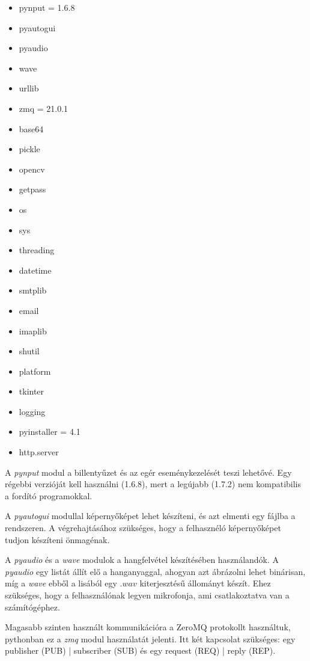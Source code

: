 \documentclass[12pt,a4paper,oneside]{report}
\begin{document}
\begin{multicols}{2}
\begin{itemize}
\item pynput = 1.6.8
\item pyautogui
\item pyaudio
\item wave
\item urllib
\item zmq = 21.0.1
\item base64
\item pickle
\item opencv
\item getpass
\item os
\item sys
\item threading
\item datetime
\item smtplib
\item email
\item imaplib
\item shutil
\item platform
\item tkinter
\item logging
\item pyinstaller = 4.1
\item http.server
\end{itemize}
\end{multicols}
A \emph{pynput} modul a billentyűzet és az egér eseménykezelését teszi lehetővé. Egy régebbi verzióját kell használni (1.6.8), mert a legújabb (1.7.2) nem kompatibilis a fordító programokkal.

A \emph{pyautogui} modullal képernyőképet lehet készíteni, és azt elmenti egy fájlba a rendszeren. A végrehajtásához szükséges, hogy a felhasznéló képernyőképet tudjon készíteni önmagénak.

A \emph{pyaudio} és a \emph{wave} modulok a hangfelvétel készítésében használandók. A \emph{pyaudio} egy listát állít elő a hanganyaggal, ahogyan azt ábrázolni lehet binárisan, míg a \emph{wave} ebből a lisából egy $.wav$ kiterjesztésű állományt készít. Ehez szükséges, hogy a felhasználónak legyen mikrofonja, ami csatlakoztatva van a számítógéphez.

Magasabb szinten használt kommunikációra a ZeroMQ protokollt használtuk, pythonban ez a \emph{zmq} modul használatát jelenti. Itt két kapcsolat szükséges: egy publisher (PUB) | subscriber (SUB) és egy request (REQ) | reply (REP).
\end{document}
